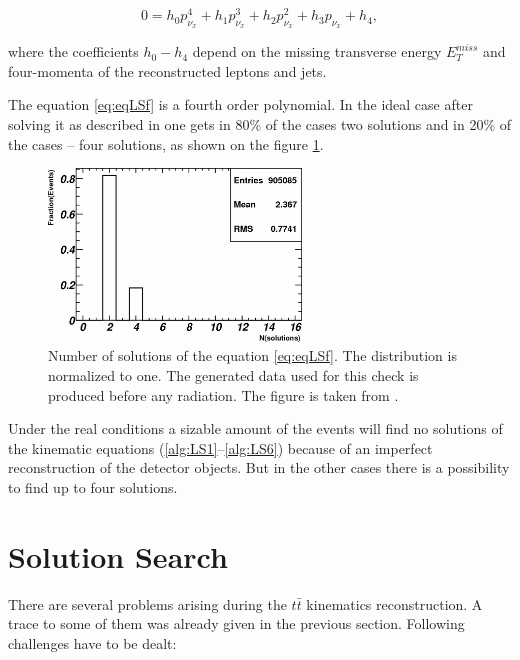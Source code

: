 \begin{equation}\label{eq:eqLSf}
 0 = h_{0} p_{\nu_{x}}^{4} + h_{1} p_{\nu_{x}}^{3} + h_{2} p_{\nu_{x}}^{2} + h_{3} p_{\nu_{x}} + h_{4},
\end{equation}

where the coefficients $h_{0} - h_{4}$ \cite{LSpaper, LSerrat} depend on the missing transverse energy $E_{T}^{miss}$ and four-momenta of the reconstructed 
leptons and jets. 

The equation \ref{eq:eqLSf} is a fourth order polynomial. In the ideal case after solving it as described in \cite{LSpaper} one gets
in 80$\%$ of the cases two solutions and in 20$\%$ of the cases -- four solutions, as shown on the figure \ref{fig:LSNsol}.

\begin{figure}[t]
  \centering
  \includegraphics[width=0.6\textwidth]{05_kinReco/plots/medium.png}
  \caption{Number of solutions of the equation \ref{eq:eqLSf}. The distribution is normalized to one. The generated data used for this check
  is produced before any radiation. The figure is taken from \cite{LSpaper}.}
  \label{fig:LSNsol}
\end{figure}

Under the real conditions a sizable amount of the events will find no solutions of the kinematic equations (\ref{alg:LS1}--\ref{alg:LS6})
because of an imperfect reconstruction of the detector objects. But in the other cases there is a possibility to find up to four solutions.

\section{Solution Search}\label{sec:SolSer}

There are several problems arising during the $t\bar{t}$ kinematics reconstruction. A trace to some of them was already given in the previous
section. Following challenges have to be dealt:

